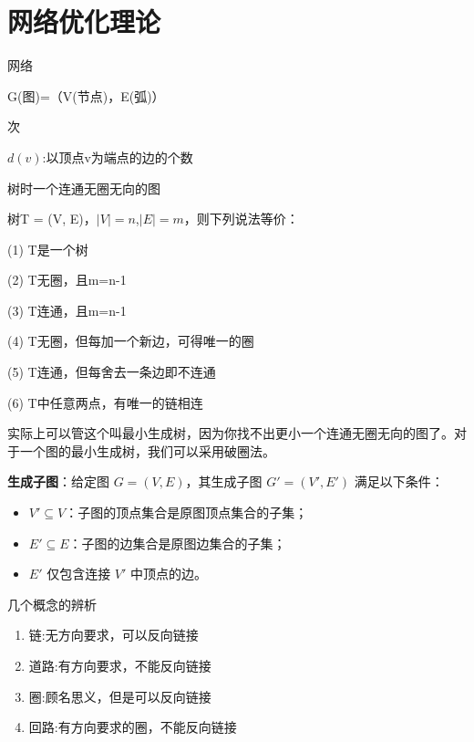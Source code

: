 \documentclass[12pt, a4paper, oneside, UTF8]{ctexbook}
\begin{document}
% 
\else
\fi

\chapter{网络优化理论}

\begin{definition}
    网络

    G(图)=（V(节点)，E(弧)）
\end{definition}

\begin{definition}
    次

    $d(v)$:以顶点v为端点的边的个数
\end{definition}

\begin{definition}
    树时一个连通无圈无向的图

    树T = (V, E)，$|V|=n$,$|E|=m$，则下列说法等价：

(1) T是一个树

(2) T无圈，且m=n-1

(3) T连通，且m=n-1

(4) T无圈，但每加一个新边，可得唯一的圈

(5) T连通，但每舍去一条边即不连通

(6) T中任意两点，有唯一的链相连
\end{definition}

实际上可以管这个叫最小生成树，因为你找不出更小一个连通无圈无向的图了。对于一个图的最小生成树，我们可以采用破圈法。

\begin{definition}
    \textbf{生成子图}：给定图 \( G = (V, E) \)，其生成子图 \( G' = (V', E') \) 满足以下条件：
    \begin{itemize}
        \item \( V' \subseteq V \)：子图的顶点集合是原图顶点集合的子集；
        \item \( E' \subseteq E \)：子图的边集合是原图边集合的子集；
        \item \( E' \) 仅包含连接 \( V' \) 中顶点的边。
    \end{itemize}
\end{definition}

\begin{remark}
    几个概念的辨析

    \begin{enumerate}
        \item 链:无方向要求，可以反向链接
        \item 道路:有方向要求，不能反向链接
        \item 圈:顾名思义，但是可以反向链接
        \item 回路:有方向要求的圈，不能反向链接
    \end{enumerate}
\end{remark}
\end{document}
